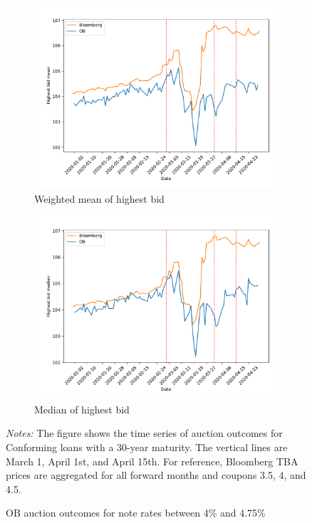 \documentclass[11pt,a4paper]{article}
\begin{document}
\begin{figure}[h]
\begin{subfigure}[b]{0.49\textwidth}
      \includegraphics[width=0.998\textwidth]{../results/figures/w_winner_bid_mean_mat30_loan1_timeseries_nr_4_4.75.pdf}
      \caption{ Weighted mean of highest bid}
     \end{subfigure}
     \begin{subfigure}[b]{0.49\textwidth}
      \includegraphics[width=0.998\textwidth]{../results/figures/winner_bid_median_mat30_loan1_timeseries_nr_4_4.75.pdf}
      \caption{ Median of highest bid}
     \end{subfigure}
   \caption{OB auction outcomes for note rates between 4\% and 4.75\%}
   \begin{minipage}{\textwidth}
      \footnotesize{\textit{Notes:} The figure shows the time series of auction outcomes for Conforming loans with a 30-year maturity.  The vertical lines are March 1, April 1st, and April 15th. For reference, Bloomberg TBA prices are aggregated for all forward months and coupons 3.5, 4, and 4.5. } 
      \end{minipage}
\end{figure}
\end{document}
